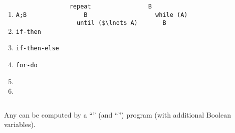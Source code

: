 \begin{frame}[fragile]{}
  \begin{columns}
      \begin{enumerate}[(1)]
	\item \texttt{A;B}
	\item \texttt{if-then} 
	\item \texttt{if-then-else} 
	\item \texttt{for-do} 
	\item {} 
	\item {}
      \end{enumerate}
      \pause
      \begin{lstlisting}[style = Cstyle, backgroundcolor = \color{teal!10!lightgray}]
  repeat
    B
  until ($\lnot$ A)
      \end{lstlisting}
      \pause
      \begin{lstlisting}[style = Cstyle]
  B
  while (A)
    B
      \end{lstlisting}
  \end{columns}

  \vspace{0.60cm}
  \pause
  \begin{theorem}
     Any  can be computed by a 
    ``'' (and ``\red{\textsf{;}}'') program
    (with additional Boolean variables).
  \end{theorem}
\end{frame}

\begin{frame}{}

  \pause
  \begin{center}
  \end{center}
\end{frame}

